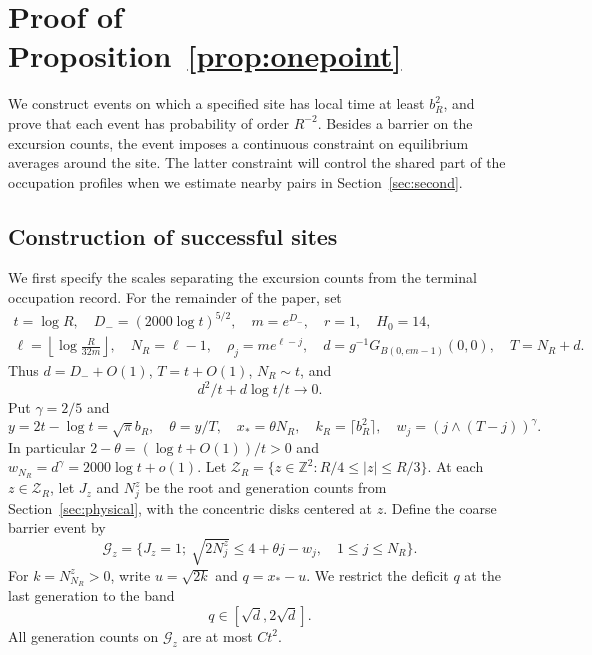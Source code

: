 \documentclass[11pt,a4paper]{article}
\numberwithin{equation}{section}
\theoremstyle{remark}
\begin{document}
\section{Proof of Proposition~\ref{prop:onepoint}}\label{sec:events}
We construct events on which a specified site has local time at least $b_R^2$, and prove that each event has probability of order $R^{-2}$. Besides a barrier on the excursion counts, the event imposes a continuous constraint on equilibrium averages around the site. The latter constraint will control the shared part of the occupation profiles when we estimate nearby pairs in Section~\ref{sec:second}.

\subsection{Construction of successful sites}\label{sec:lowerscales}
We first specify the scales separating the excursion counts from the terminal occupation record. For the remainder of the paper, set
\begin{equation}\label{eq:5.1}
\begin{gathered}
t=\log R,\quad D_-=(2000\log t)^{5/2},\quad m=e^{D_-},\quad r=1,\quad H_0=14,\\
\ell=\left\lfloor\log\frac R{32m}\right\rfloor,\quad N_R=\ell-1,
\quad\rho_j=me^{\ell-j},\quad
d=g^{-1}G_{B(0,em-1)}(0,0),\quad T=N_R+d.
\end{gathered}
\end{equation}
Thus $d=D_-+O(1)$, $T=t+O(1)$, $N_R\sim t$, and
\begin{equation}\label{eq:5.2}
d^2/t+d\log t/t\longrightarrow0.
\end{equation}
Put $\gamma=2/5$ and
\begin{equation}\label{eq:5.3}
y=2t-\log t=\sqrt\pi b_R,\quad \theta=y/T,\quad
x_*=\theta N_R,\quad k_R=\lceil b_R^2\rceil,\quad
w_j=(j\wedge(T-j))^\gamma.
\end{equation}
In particular $2-\theta=(\log t+O(1))/t>0$ and
$w_{N_R}=d^\gamma=2000\log t+o(1)$.
Let $\mathscr Z_R=\{z\in\mathbb Z^2:R/4\le |z|\le R/3\}$.
At each $z\in\mathscr Z_R$, let $J_z$ and $N_j^z$ be the root and generation counts from
Section~\ref{sec:physical}, with the concentric disks centered at $z$. Define the coarse barrier event by
\begin{equation}\label{eq:5.4}
\mathcal G_z=\{J_z=1;\ \sqrt{2N_j^z}\le4+\theta j-w_j,
\quad 1\le j\le N_R\}.
\end{equation}
For $k=N_{N_R}^z>0$, write $u=\sqrt{2k}$ and $q=x_*-u$. We restrict the deficit $q$ at the last generation to the band
\begin{equation}\label{eq:5.5}
q\in[\sqrt d,2\sqrt d].
\end{equation}
All generation counts on $\mathcal G_z$ are at most $Ct^2$.
\end{document}

